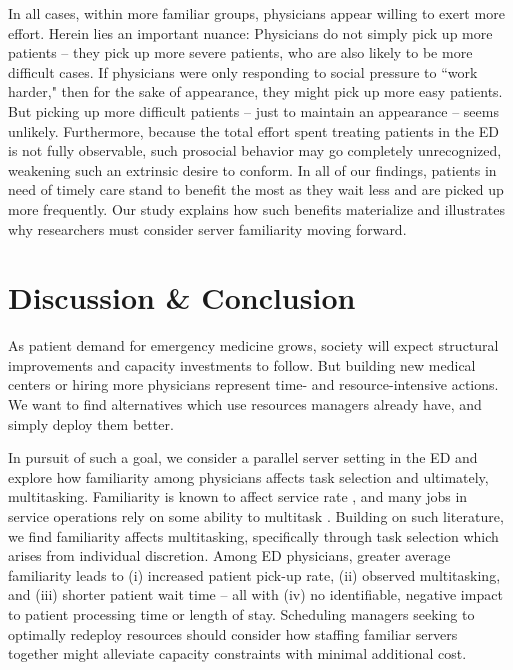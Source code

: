  In all cases, within more familiar groups, physicians appear willing to exert more effort. Herein lies an important nuance: Physicians do not simply pick up more patients -- they pick up more severe patients, who are also likely to be more difficult cases. If physicians were only responding to social pressure to “work harder," then for the sake of appearance, they might pick up more easy patients. But picking up more difficult patients -- just to maintain an appearance -- seems unlikely. Furthermore, because the total effort spent treating patients in the ED is not fully observable, such prosocial behavior may go completely unrecognized, weakening such an extrinsic desire to conform. In all of our findings, patients in need of timely care stand to benefit the most as they wait less and are picked up more frequently. Our study explains how such benefits materialize and illustrates why researchers must consider server familiarity moving forward.

\section{Discussion \& Conclusion} \label{Conc_PU}
 As patient demand for emergency medicine grows, society will expect structural improvements and capacity investments to follow. But building new medical centers \citep{Woodworth2019,Li2021} or hiring more physicians represent time- and resource-intensive actions. We want to find alternatives which use resources managers already have, and simply deploy them better.
 
 In pursuit of such a goal, we consider a parallel server setting in the ED and explore how familiarity among physicians affects task selection and ultimately, multitasking. Familiarity is known to affect service rate \citep[e.g.,][]{Reagans2005}, and many jobs in service operations rely on some ability to multitask \citep[Section 5.1]{KC2020_productivity}. Building on such literature, we find familiarity affects multitasking, specifically through task selection which arises from individual discretion. Among ED physicians, greater average familiarity leads to (i) increased patient pick-up rate, (ii) observed multitasking, and (iii) shorter patient wait time -- all with (iv) no identifiable, negative impact to patient processing time or length of stay. Scheduling managers seeking to optimally redeploy resources should consider how staffing familiar servers together might alleviate capacity constraints with minimal additional cost.
 
